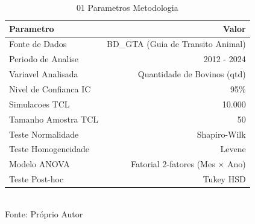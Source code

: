 \begin{table}[H]
\centering
\small
\caption{01 Parametros Metodologia}
\label{tab:01_01_Parametros_Metodologia}
\begin{tabular}{|l|r|}
\hline
\textbf{Parametro} & \textbf{Valor} \\
\hline
Fonte de Dados & BD\_GTA (Guia de Transito Animal) \\
Periodo de Analise & 2012 - 2024 \\
Variavel Analisada & Quantidade de Bovinos (qtd) \\
Nivel de Confianca IC & 95\% \\
Simulacoes TCL & 10.000 \\
Tamanho Amostra TCL & 50 \\
Teste Normalidade & Shapiro-Wilk \\
Teste Homogeneidade & Levene \\
Modelo ANOVA & Fatorial 2-fatores (Mes × Ano) \\
Teste Post-hoc & Tukey HSD \\
\hline
\end{tabular}
\\ \small Fonte: Próprio Autor
\end{table}
